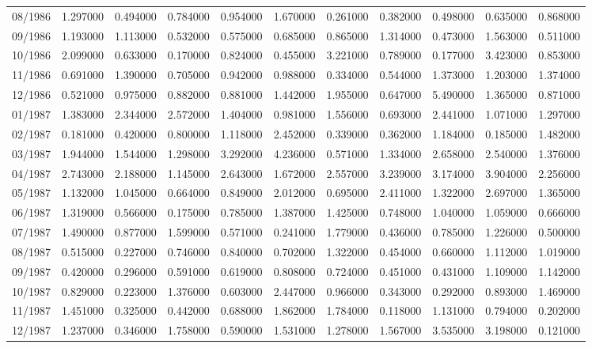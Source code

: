 \begin{tabular}{lrrrrrrrrrr}
08/1986 & 1.297000 & 0.494000 & 0.784000 & 0.954000 & 1.670000 & 0.261000 & 0.382000 & 0.498000 & 0.635000 & 0.868000 \\
09/1986 & 1.193000 & 1.113000 & 0.532000 & 0.575000 & 0.685000 & 0.865000 & 1.314000 & 0.473000 & 1.563000 & 0.511000 \\
10/1986 & 2.099000 & 0.633000 & 0.170000 & 0.824000 & 0.455000 & 3.221000 & 0.789000 & 0.177000 & 3.423000 & 0.853000 \\
11/1986 & 0.691000 & 1.390000 & 0.705000 & 0.942000 & 0.988000 & 0.334000 & 0.544000 & 1.373000 & 1.203000 & 1.374000 \\
12/1986 & 0.521000 & 0.975000 & 0.882000 & 0.881000 & 1.442000 & 1.955000 & 0.647000 & 5.490000 & 1.365000 & 0.871000 \\
01/1987 & 1.383000 & 2.344000 & 2.572000 & 1.404000 & 0.981000 & 1.556000 & 0.693000 & 2.441000 & 1.071000 & 1.297000 \\
02/1987 & 0.181000 & 0.420000 & 0.800000 & 1.118000 & 2.452000 & 0.339000 & 0.362000 & 1.184000 & 0.185000 & 1.482000 \\
03/1987 & 1.944000 & 1.544000 & 1.298000 & 3.292000 & 4.236000 & 0.571000 & 1.334000 & 2.658000 & 2.540000 & 1.376000 \\
04/1987 & 2.743000 & 2.188000 & 1.145000 & 2.643000 & 1.672000 & 2.557000 & 3.239000 & 3.174000 & 3.904000 & 2.256000 \\
05/1987 & 1.132000 & 1.045000 & 0.664000 & 0.849000 & 2.012000 & 0.695000 & 2.411000 & 1.322000 & 2.697000 & 1.365000 \\
06/1987 & 1.319000 & 0.566000 & 0.175000 & 0.785000 & 1.387000 & 1.425000 & 0.748000 & 1.040000 & 1.059000 & 0.666000 \\
07/1987 & 1.490000 & 0.877000 & 1.599000 & 0.571000 & 0.241000 & 1.779000 & 0.436000 & 0.785000 & 1.226000 & 0.500000 \\
08/1987 & 0.515000 & 0.227000 & 0.746000 & 0.840000 & 0.702000 & 1.322000 & 0.454000 & 0.660000 & 1.112000 & 1.019000 \\
09/1987 & 0.420000 & 0.296000 & 0.591000 & 0.619000 & 0.808000 & 0.724000 & 0.451000 & 0.431000 & 1.109000 & 1.142000 \\
10/1987 & 0.829000 & 0.223000 & 1.376000 & 0.603000 & 2.447000 & 0.966000 & 0.343000 & 0.292000 & 0.893000 & 1.469000 \\
11/1987 & 1.451000 & 0.325000 & 0.442000 & 0.688000 & 1.862000 & 1.784000 & 0.118000 & 1.131000 & 0.794000 & 0.202000 \\
12/1987 & 1.237000 & 0.346000 & 1.758000 & 0.590000 & 1.531000 & 1.278000 & 1.567000 & 3.535000 & 3.198000 & 0.121000 \\

\end{tabular}
